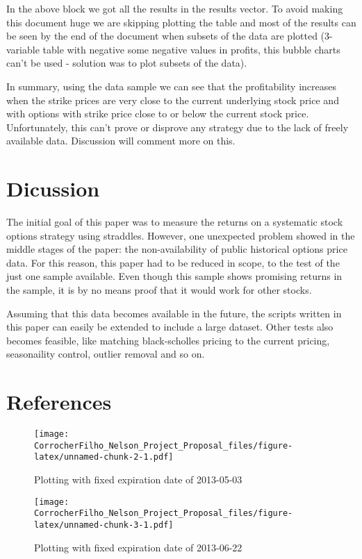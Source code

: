 \documentclass[english,man]{apa6}
\begin{document}
In the above block we got all the results in the results vector. To
avoid making this document huge we are skipping plotting the table and
most of the results can be seen by the end of the document when subsets
of the data are plotted (3-variable table with negative some negative
values in profits, this bubble charts can't be used - solution was to
plot subsets of the data).

In summary, using the data sample we can see that the profitability
increases when the strike prices are very close to the current
underlying stock price and with options with strike price close to or
below the current stock price. Unfortunately, this can't prove or
disprove any strategy due to the lack of freely available data.
Discussion will comment more on this.

\section{Dicussion}\label{dicussion}

The initial goal of this paper was to measure the returns on a
systematic stock options strategy using straddles. However, one
unexpected problem showed in the middle stages of the paper: the
non-availability of public historical options price data. For this
reason, this paper had to be reduced in scope, to the test of the just
one sample available. Even though this sample shows promising returns in
the sample, it is by no means proof that it would work for other stocks.

Assuming that this data becomes available in the future, the scripts
written in this paper can easily be extended to include a large dataset.
Other tests also becomes feasible, like matching black-scholles pricing
to the current pricing, seasonaility control, outlier removal and so on.

\newpage

\section{References}\label{references}

\begin{figure}[htbp]
\centering
\texttt{[image: CorrocherFilho\_Nelson\_Project\_Proposal\_files/figure-latex/unnamed-chunk-2-1.pdf]}
\caption{\label{fig:unnamed-chunk-2}Plotting with fixed expiration date of
2013-05-03}
\end{figure}

\begin{figure}[htbp]
\centering
\texttt{[image: CorrocherFilho\_Nelson\_Project\_Proposal\_files/figure-latex/unnamed-chunk-3-1.pdf]}
\caption{\label{fig:unnamed-chunk-3}Plotting with fixed expiration date of
2013-06-22}
\end{figure}
\end{document}
